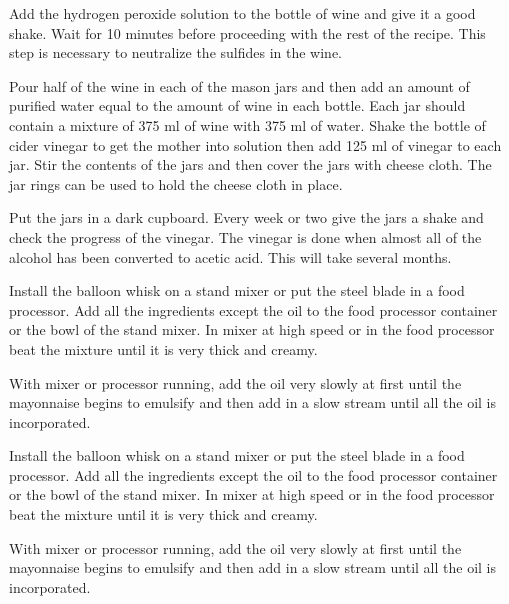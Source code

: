 \documentclass[letterpaper]{recipePMG}
\begin{document}
Add the hydrogen peroxide solution to the bottle of wine and give it a good shake. Wait for 10 minutes before proceeding with the rest of the recipe.  This step is necessary to neutralize the sulfides in the wine.

Pour half of the wine in each of the mason jars and then add an amount of purified water equal to the amount of wine in each bottle.  Each jar should contain a mixture of 375 ml of wine with 375 ml of water. Shake the bottle of cider vinegar to get the mother into solution then add 125 ml of vinegar to each jar.  Stir the contents of the jars and then cover the jars with cheese cloth.  The jar rings can be used to hold the cheese cloth in place.

Put the jars in a dark cupboard. Every week or two give the jars a shake and check the progress of the vinegar. The vinegar is done when almost all of the alcohol has been converted to acetic acid. This will take several months.

\newpage
{}


Install the balloon whisk on a stand mixer or put the steel blade in a food processor. Add all the ingredients except the oil to the food processor container or the bowl of the stand mixer. In mixer at high speed or in the food processor beat the mixture until it is very thick and creamy.

With mixer or processor running, add the oil very slowly at first until the mayonnaise begins to emulsify and then add in a slow stream until all the oil is incorporated.

\label{MyMayonnaise}


Install the balloon whisk on a stand mixer or put the steel blade in a food processor. Add all the ingredients except the oil to the food processor container or the bowl of the stand mixer. In mixer at high speed or in the food processor beat the mixture until it is very thick and creamy.

With mixer or processor running, add the oil very slowly at first until the mayonnaise begins to emulsify and then add in a slow stream until all the oil is incorporated.
\end{document}
